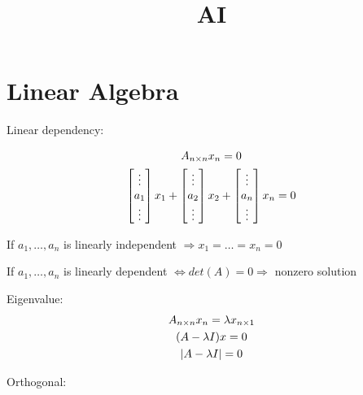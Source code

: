\documentclass{blog}
\title{AI}
\begin{document}
\maketitle
\tableofcontents
\section{Linear Algebra}
\begin{definition}
    Linear dependency:

    \begin{gather*}
        A_{n \times n} x_{n \time 1} = 0 \\
        \begin{bmatrix}\vdots \\ a_{1} \\ \vdots\end{bmatrix} x_{1}
        + \begin{bmatrix}\vdots \\ a_{2} \\ \vdots\end{bmatrix} x_{2}
        + \begin{bmatrix}\vdots \\ a_{n} \\ \vdots\end{bmatrix} x_{n} = 0
    \end{gather*}

    If $a_{1}, \dots, a_{n}$ is linearly independent $\Rightarrow x_{1} = \dots = x_{n} = 0$

    If $a_{1}, \dots, a_{n}$ is linearly dependent $\Leftrightarrow det(A) = 0 \Rightarrow$ nonzero solution
\end{definition}

\begin{definition}
    Eigenvalue:
    \begin{gather}
        A_{n \times n}x_{n \time 1} = \lambda x_{n \times 1} \label{eq:eigen-value} \\
        (A - \lambda I) x = 0 \nonumber \\
        |A - \lambda I| = 0
    \end{gather}

\end{definition}

\begin{definition}
    Orthogonal:
\end{definition}
\end{document}
